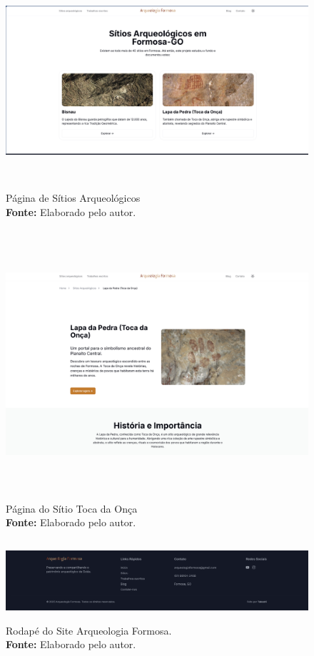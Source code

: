 \begin{figure}[H]
    \centering
    \includegraphics[height=8cm, keepaspectratio]{img/site/sitios arqueologicos.png}
    \caption{Página de Sítios Arqueológicos \\
    \textbf{Fonte:} Elaborado pelo autor.}
    \label{fig:pagina_sitiosarqueologicos}
\end{figure}



\begin{figure}[H]
    \centering
    \includegraphics[height=10cm, keepaspectratio]{img/site/pagina_toca_da_onca.png}
    \caption{Página do Sítio Toca da Onça \\
    \textbf{Fonte:} Elaborado pelo autor.}
    \label{fig:pagina_tocadaonca}
\end{figure}


\begin{figure}[H]
    \centering
    \includegraphics[height=3cm, keepaspectratio]{img/site/footer.png}
    \caption{Rodapé do Site Arqueologia Formosa. \\
    \textbf{Fonte:} Elaborado pelo autor.}
    \label{fig:footer}
\end{figure}

